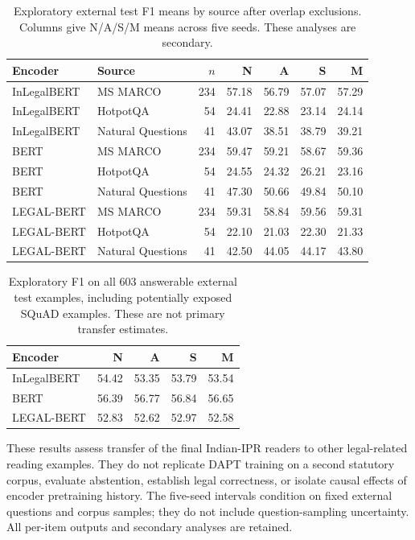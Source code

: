 \begin{table}[!htbp]
\caption{Exploratory external test F1 means by source after overlap exclusions.
Columns give N/A/S/M means across five seeds. These analyses are secondary.}
\label{tab:legalqaeval_sources}
\centering\scriptsize
\begin{tabular}{@{}llrrrrr@{}}
\toprule
Encoder & Source & $n$ & N & A & S & M \\
\midrule
InLegalBERT & MS MARCO & 234 & 57.18 & 56.79 & 57.07 & 57.29 \\
InLegalBERT & HotpotQA & 54 & 24.41 & 22.88 & 23.14 & 24.14 \\
InLegalBERT & Natural Questions & 41 & 43.07 & 38.51 & 38.79 & 39.21 \\
BERT & MS MARCO & 234 & 59.47 & 59.21 & 58.67 & 59.36 \\
BERT & HotpotQA & 54 & 24.55 & 24.32 & 26.21 & 23.16 \\
BERT & Natural Questions & 41 & 47.30 & 50.66 & 49.84 & 50.10 \\
LEGAL-BERT & MS MARCO & 234 & 59.31 & 58.84 & 59.56 & 59.31 \\
LEGAL-BERT & HotpotQA & 54 & 22.10 & 21.03 & 22.30 & 21.33 \\
LEGAL-BERT & Natural Questions & 41 & 42.50 & 44.05 & 44.17 & 43.80 \\
\bottomrule
\end{tabular}
\end{table}

\begin{table}[!htbp]
\caption{Exploratory F1 on all 603 answerable external test examples,
including potentially exposed SQuAD examples. These are not primary transfer estimates.}
\label{tab:legalqaeval_all_answerable}
\centering\small
\begin{tabular}{@{}lrrrr@{}}
\toprule
Encoder & N & A & S & M \\
\midrule
InLegalBERT & 54.42 & 53.35 & 53.79 & 53.54 \\
BERT & 56.39 & 56.77 & 56.84 & 56.65 \\
LEGAL-BERT & 52.83 & 52.62 & 52.97 & 52.58 \\
\bottomrule
\end{tabular}
\end{table}

These results assess transfer of the final Indian-IPR readers to other
legal-related reading examples. They do not replicate DAPT training
on a second statutory corpus, evaluate abstention, establish legal
correctness, or isolate causal effects of encoder pretraining history.
The five-seed intervals condition on fixed external questions and
corpus samples; they do not include question-sampling uncertainty.
All per-item outputs and secondary analyses are retained.
\FloatBarrier
